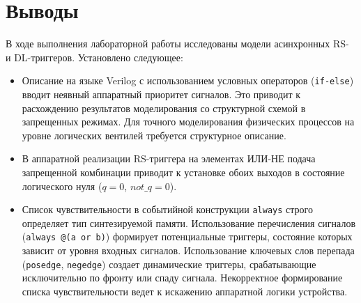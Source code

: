 \section*{Выводы}
В ходе выполнения лабораторной работы исследованы модели асинхронных RS- и DL-триггеров. Установлено следующее:
\begin{itemize}
    \item Описание на языке Verilog с использованием условных операторов (\texttt{if-else}) вводит неявный аппаратный приоритет сигналов. Это приводит к расхождению результатов моделирования со структурной схемой в запрещенных режимах. Для точного моделирования физических процессов на уровне логических вентилей требуется структурное описание.
    \item В аппаратной реализации RS-триггера на элементах ИЛИ-НЕ подача запрещенной комбинации приводит к установке обоих выходов в состояние логического нуля ($q = 0$, $not\_q = 0$).
    \item Список чувствительности в событийной конструкции \texttt{always} строго определяет тип синтезируемой памяти. Использование перечисления сигналов (\texttt{always @(a or b)}) формирует потенциальные триггеры, состояние которых зависит от уровня входных сигналов. Использование ключевых слов перепада (\texttt{posedge}, \texttt{negedge}) создает динамические триггеры, срабатывающие исключительно по фронту или спаду сигнала. Некорректное формирование списка чувствительности ведет к искажению аппаратной логики устройства.
\end{itemize}
